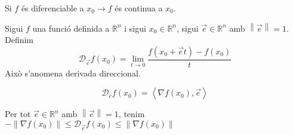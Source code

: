 \documentclass[../main.tex]{subfiles}
\begin{document}
    \begin{proposicio}
        Si $f$ és diferenciable a $x_0 \rightarrow f$ és continua a $x_0$.
    \end{proposicio}
    \begin{definicio}
        Sigui $f$ una funció definida a $\mathbb{R}^n$ i sigui $x_0 \in \mathbb{R}^n$,
        sigui $\vec{e} \in \mathbb{R}^n$ amb $\left\lVert \vec{e} \right\rVert = 1$. Definim
        \begin{displaymath}
            \mathcal{D}_{\vec{e}}f\left(x_0\right) = \lim\limits_{t\to0} \frac{f\left(x_0+\vec{e} t\right)-f\left(x_0\right)}{t}
        \end{displaymath}
        Això s'anomena derivada direccional. 
    \end{definicio}
    \begin{proposicio}
        \begin{displaymath}
            \mathcal{D}_ef\left(x_0\right) = \left\langle \nabla f \left(x_0\right), \vec{e}\right\rangle 
        \end{displaymath}
    \end{proposicio}
    \begin{corolari}
        Per tot $\vec{e} \in \mathbb{R}^n$ amb $\left\lVert \vec{e} \right\rVert = 1$, tenim $-\left\lVert \nabla f(x_0)\right\rVert \leq \mathcal{D}_{\vec{e}}f\left(x_0\right) \leq \left\lVert \nabla f(x_0)\right\rVert$ 
    \end{corolari}
\end{document}
